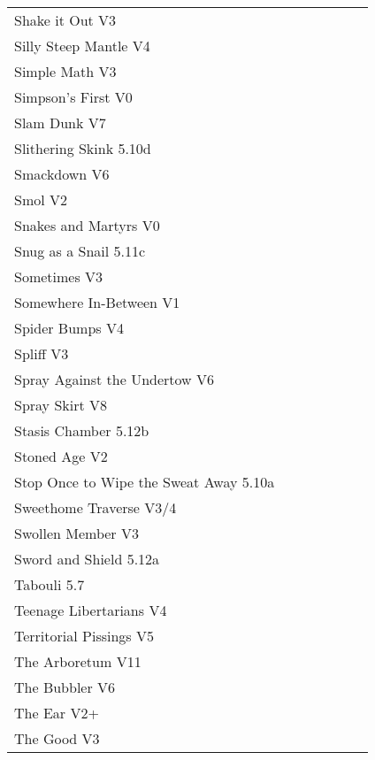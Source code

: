 \begin{flushleft}
\begin{center}
\begin{supertabular}{p{0.76\linewidth}p{0.08\linewidth}}
Shake it Out V3 & \pageref{vr:Shake it Out} \\
Silly Steep Mantle V4 & \pageref{rt:Silly Steep Mantle} \\
Simple Math V3 & \pageref{rt:Simple Math} \\
Simpson's First V0 & \pageref{rt:Simpson's First} \\
Slam Dunk V7 & \pageref{rt:Slam Dunk} \\
Slithering Skink 5.10d & \pageref{rt:Slithering Skink} \\
Smackdown V6 & \pageref{rt:Smackdown} \\
Smol V2 & \pageref{rt:Smol} \\
Snakes and Martyrs V0 & \pageref{rt:Snakes and Martyrs} \\
Snug as a Snail 5.11c & \pageref{rt:Snug as a Snail} \\
Sometimes V3 & \pageref{rt:Sometimes} \\
Somewhere In-Between V1 & \pageref{rt:Somewhere In-Between} \\
Spider Bumps V4 & \pageref{rt:Spider Bumps} \\
Spliff V3 & \pageref{rt:Spliff} \\
Spray Against the Undertow V6 & \pageref{vr:Spray Against the Undertow} \\
Spray Skirt V8 & \pageref{rt:Spray Skirt} \\
Stasis Chamber 5.12b & \pageref{rt:Stasis Chamber} \\
Stoned Age V2 & \pageref{rt:Stoned Age} \\
Stop Once to Wipe the Sweat Away 5.10a & \pageref{rt:Stop Once to Wipe the Sweat Away} \\
Sweethome Traverse V3/4 & \pageref{vr:Sweethome Traverse} \\
Swollen Member V3 & \pageref{rt:Swollen Member} \\
Sword and Shield 5.12a & \pageref{rt:Sword and Shield} \\
Tabouli 5.7 & \pageref{rt:Tabouli} \\
Teenage Libertarians V4 & \pageref{rt:Teenage Libertarians} \\
Territorial Pissings V5 & \pageref{rt:Territorial Pissings} \\
The Arboretum V11 & \pageref{rt:The Arboretum} \\
The Bubbler V6 & \pageref{rt:The Bubbler} \\
The Ear V2+ & \pageref{rt:The Ear} \\
The Good V3 & \pageref{rt:The Good} \\

\end{supertabular}
\end{center}
\end{flushleft}

